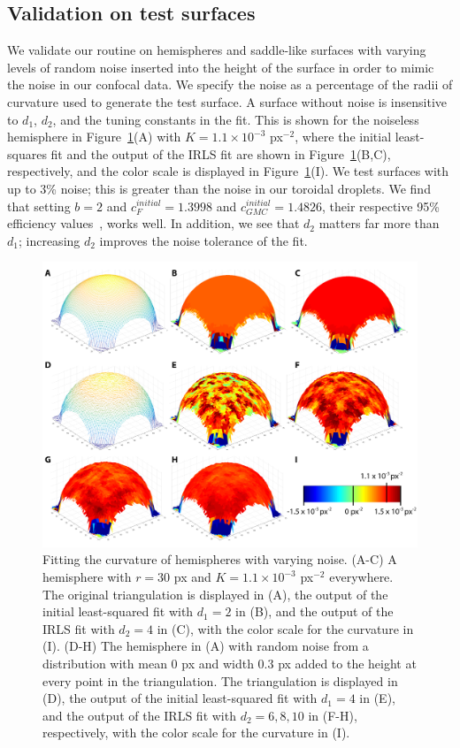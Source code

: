 \subsection{Validation on test surfaces}
We validate our routine on hemispheres and saddle-like surfaces with varying levels of random noise inserted into the height of the surface in order to mimic the noise in our confocal data.
We specify the noise as a percentage of the radii of curvature used to generate the test surface.
A surface without noise is insensitive to $d_1$, $d_2$, and the tuning constants in the fit.
This is shown for the noiseless hemisphere in Figure~\ref{f:3-CurvFitSphere}(A) with $K = 1.1 \times 10^{-3}$ px$^{-2}$, where the initial least-squares fit and the output of the IRLS fit are shown in Figure~\ref{f:3-CurvFitSphere}(B,C), respectively, and the color scale is displayed in Figure~\ref{f:3-CurvFitSphere}(I).
We test surfaces with up to 3\% noise; this is greater than the noise in our toroidal droplets.
We find that setting $b=2$ and $c_{F}^{initial} = 1.3998$ and $c_{GMC}^{initial}=1.4826$, their respective 95\% efficiency values~\cite{RN52,RN318}, works well.
In addition, we see that $d_2$ matters far more than $d_1$; increasing $d_2$ improves the noise tolerance of the fit.
\begin{figure}
  \centering
  \includegraphics{figures/C3/Ch3-Figs_CurvFitSphere.png}
  \caption{Fitting the curvature of hemispheres with varying noise.
  (A-C) A hemisphere with $r = 30$ px and $K = 1.1 \times 10^{-3}$ px$^{-2}$ everywhere.
  The original triangulation is displayed in (A), the output of the initial least-squared fit with $d_1=2$ in (B), and the output of the IRLS fit with $d_2=4$ in (C), with the color scale for the curvature in (I).
  (D-H) The hemisphere in (A) with random noise from a distribution with mean 0 px and width 0.3 px added to the height at every point in the triangulation.
  The triangulation is displayed in (D), the output of the initial least-squared fit with $d_1=4$ in (E), and the output of the IRLS fit with $d_2=6,8,10$ in (F-H), respectively, with the color scale for the curvature in (I).}\label{f:3-CurvFitSphere}
\end{figure}

